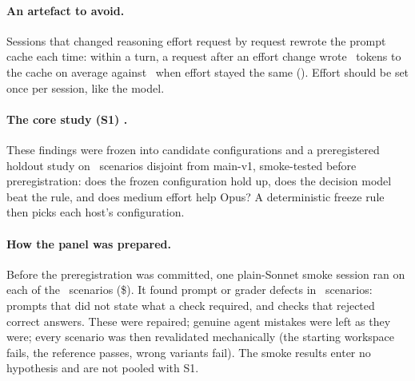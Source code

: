 \begin{table}[htbp]
\centering\scriptsize
\caption{Decide-once policies on main-v1 (exploratory): share routed, geometric-mean cost ratio and turn-pass
difference against the plain host, and dollars per 1,000 sessions.}
\label{tab:a0}

\end{table}

\paragraph{An artefact to avoid.} Sessions that changed reasoning effort request by request rewrote the prompt cache
each time: within a turn, a request after an effort change wrote \AoEcChanged\ tokens to the cache on average against
\AoEcUnchanged\ when effort stayed the same (\AoEcX\X). Effort should be set once per session, like the model.

\paragraph{The core study (S1) \texorpdfstring{\prereg}{[preregistered]}.} These findings were frozen into candidate
configurations and a preregistered holdout study on \SOnePanelN\ scenarios disjoint from main-v1, smoke-tested before
preregistration: does the frozen configuration hold up, does the decision model beat the rule, and does medium effort
help Opus? A deterministic freeze rule then picks each host's configuration.

\paragraph{How the panel was prepared.} Before the preregistration was committed, one plain-Sonnet smoke session ran on
each of the \SmokeN\ scenarios (\$\SmokeUSD). It found prompt or grader defects in \SmokeFixed\ scenarios: prompts that
did not state what a check required, and checks that rejected correct answers. These were repaired; genuine agent
mistakes were left as they were; every scenario was then revalidated mechanically (the starting workspace fails, the
reference passes, wrong variants fail). The smoke results enter no hypothesis and are not pooled with S1.

